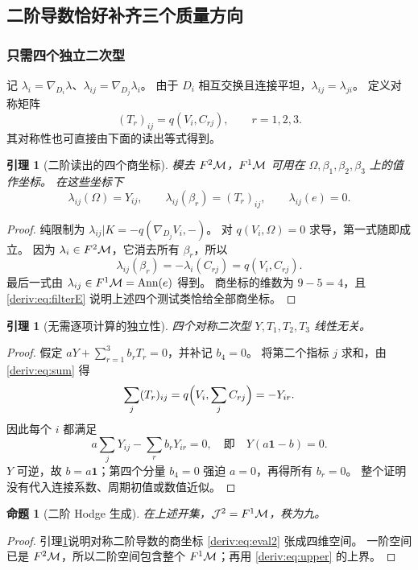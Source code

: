 \documentclass[11pt,a4paper,oneside]{ctexart}
\theoremstyle{cnplain}
\newtheorem{proposition}[theorem]{命题}
\newtheorem{lemma}[theorem]{引理}
\theoremstyle{definition}
\theoremstyle{remark}
\numberwithin{equation}{section}
\begin{document}
\subsection{二阶导数恰好补齐三个质量方向}
\subsubsection{只需四个独立二次型}
记 $\lambda_i=\nabla_{D_i}\lambda$、$\lambda_{ij}=\nabla_{D_j}\lambda_i$。
由于 $D_i$ 相互交换且连接平坦，$\lambda_{ij}=\lambda_{ji}$。
定义对称矩阵
\begin{equation}\label{deriv:eq:T}
 (T_r)_{ij}=q(V_i,C_{rj}),\qquad r=1,2,3.
\end{equation}
其对称性也可直接由下面的读出等式得到。

\begin{lemma}[二阶读出的四个商坐标]\label{deriv:lem:second}
模去 $F^2\mathcal M$，$F^1\mathcal M$ 可用在 $\Omega,\beta_1,\beta_2,\beta_3$ 上的值作坐标。
在这些坐标下
\begin{equation}\label{deriv:eq:eval2}
 \lambda_{ij}(\Omega)=Y_{ij},\qquad
 \lambda_{ij}(\beta_r)=(T_r)_{ij},\qquad
 \lambda_{ij}(e)=0.
\end{equation}
\end{lemma}
\begin{proof}
纯限制为 $\lambda_{ij}|K=-q(\nabla_{D_j}V_i,-)$。
对 $q(V_i,\Omega)=0$ 求导，第一式随即成立。
因为 $\lambda_i\in F^2\mathcal M$，它消去所有 $\beta_r$，所以
\[
 \lambda_{ij}(\beta_r)=-\lambda_i(C_{rj})=q(V_i,C_{rj}).
\]
最后一式由 $\lambda_{ij}\in F^1\mathcal M=\operatorname{Ann}(e)$ 得到。
商坐标的维数为 $9-5=4$，且 \eqref{deriv:eq:filterE} 说明上述四个测试类恰给全部商坐标。
\end{proof}

\begin{lemma}[无需逐项计算的独立性]\label{deriv:lem:independent}
四个对称二次型 $Y,T_1,T_2,T_3$ 线性无关。
\end{lemma}
\begin{proof}
假定 $aY+\sum_{r=1}^3b_rT_r=0$，并补记 $b_4=0$。
将第二个指标 $j$ 求和，由 \eqref{deriv:eq:sum} 得
\[
 \sum_j(T_r)_{ij}
 =q\Bigl(V_i,\sum_jC_{rj}\Bigr)=-Y_{ir}.
\]
因此每个 $i$ 都满足
\[
 a\sum_jY_{ij}-\sum_rb_rY_{ir}=0,
 \quad\text{即}\quad Y(a\mathbf1-b)=0.
\]
$Y$ 可逆，故 $b=a\mathbf1$；第四个分量 $b_4=0$ 强迫 $a=0$，再得所有 $b_r=0$。
整个证明没有代入连接系数、周期初值或数值近似。
\end{proof}

\begin{proposition}[二阶 Hodge 生成]\label{deriv:prop:jet2}
在上述开集，$\mathcal J^2=F^1\mathcal M$，秩为九。
\end{proposition}
\begin{proof}
引理\ref{deriv:lem:independent}说明对称二阶导数的商坐标 \eqref{deriv:eq:eval2} 张成四维空间。
一阶空间已是 $F^2\mathcal M$，所以二阶空间包含整个 $F^1\mathcal M$；再用 \eqref{deriv:eq:upper} 的上界。
\end{proof}
\end{document}
